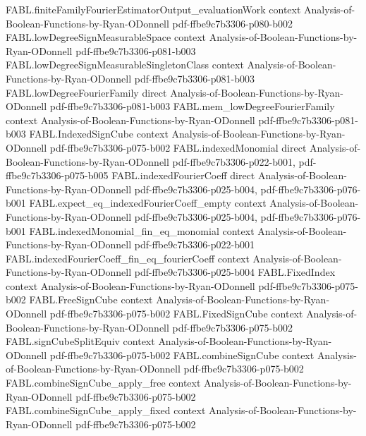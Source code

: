 \begin{theorem}
  {FABL.finiteFamilyFourierEstimatorOutput_evaluationWork}
  {context}
  {Analysis-of-Boolean-Functions-by-Ryan-ODonnell}
  {pdf-ffbe9c7b3306-p080-b002}
\proofstep
  {FABL.lowDegreeSignMeasurableSpace}
  {context}
  {Analysis-of-Boolean-Functions-by-Ryan-ODonnell}
  {pdf-ffbe9c7b3306-p081-b003}
\proofstep
  {FABL.lowDegreeSignMeasurableSingletonClass}
  {context}
  {Analysis-of-Boolean-Functions-by-Ryan-ODonnell}
  {pdf-ffbe9c7b3306-p081-b003}
\proofstep
  {FABL.lowDegreeFourierFamily}
  {direct}
  {Analysis-of-Boolean-Functions-by-Ryan-ODonnell}
  {pdf-ffbe9c7b3306-p081-b003}
\proofstep
  {FABL.mem_lowDegreeFourierFamily}
  {context}
  {Analysis-of-Boolean-Functions-by-Ryan-ODonnell}
  {pdf-ffbe9c7b3306-p081-b003}
\proofstep
  {FABL.IndexedSignCube}
  {context}
  {Analysis-of-Boolean-Functions-by-Ryan-ODonnell}
  {pdf-ffbe9c7b3306-p075-b002}
\proofstep
  {FABL.indexedMonomial}
  {direct}
  {Analysis-of-Boolean-Functions-by-Ryan-ODonnell}
  {pdf-ffbe9c7b3306-p022-b001,
    pdf-ffbe9c7b3306-p075-b005}
\proofstep
  {FABL.indexedFourierCoeff}
  {direct}
  {Analysis-of-Boolean-Functions-by-Ryan-ODonnell}
  {pdf-ffbe9c7b3306-p025-b004,
    pdf-ffbe9c7b3306-p076-b001}
\proofstep
  {FABL.expect_eq_indexedFourierCoeff_empty}
  {context}
  {Analysis-of-Boolean-Functions-by-Ryan-ODonnell}
  {pdf-ffbe9c7b3306-p025-b004,
    pdf-ffbe9c7b3306-p076-b001}
\proofstep
  {FABL.indexedMonomial_fin_eq_monomial}
  {context}
  {Analysis-of-Boolean-Functions-by-Ryan-ODonnell}
  {pdf-ffbe9c7b3306-p022-b001}
\proofstep
  {FABL.indexedFourierCoeff_fin_eq_fourierCoeff}
  {context}
  {Analysis-of-Boolean-Functions-by-Ryan-ODonnell}
  {pdf-ffbe9c7b3306-p025-b004}
\proofstep
  {FABL.FixedIndex}
  {context}
  {Analysis-of-Boolean-Functions-by-Ryan-ODonnell}
  {pdf-ffbe9c7b3306-p075-b002}
\proofstep
  {FABL.FreeSignCube}
  {context}
  {Analysis-of-Boolean-Functions-by-Ryan-ODonnell}
  {pdf-ffbe9c7b3306-p075-b002}
\proofstep
  {FABL.FixedSignCube}
  {context}
  {Analysis-of-Boolean-Functions-by-Ryan-ODonnell}
  {pdf-ffbe9c7b3306-p075-b002}
\proofstep
  {FABL.signCubeSplitEquiv}
  {context}
  {Analysis-of-Boolean-Functions-by-Ryan-ODonnell}
  {pdf-ffbe9c7b3306-p075-b002}
\proofstep
  {FABL.combineSignCube}
  {context}
  {Analysis-of-Boolean-Functions-by-Ryan-ODonnell}
  {pdf-ffbe9c7b3306-p075-b002}
\proofstep
  {FABL.combineSignCube_apply_free}
  {context}
  {Analysis-of-Boolean-Functions-by-Ryan-ODonnell}
  {pdf-ffbe9c7b3306-p075-b002}
\proofstep
  {FABL.combineSignCube_apply_fixed}
  {context}
  {Analysis-of-Boolean-Functions-by-Ryan-ODonnell}
  {pdf-ffbe9c7b3306-p075-b002}
\proofstep

\end{theorem}
